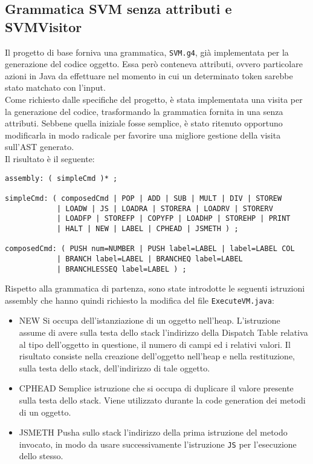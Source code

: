 \documentclass[a4paper]{article}   %
\begin{document}
\subsection{Grammatica SVM senza attributi e SVMVisitor}
Il progetto di base forniva una grammatica, \lstinline|SVM.g4|, già implementata per la generazione del codice oggetto. Essa però conteneva attributi, ovvero particolare azioni in Java da effettuare nel momento in cui un determinato token sarebbe stato matchato con l'input.\\
Come richiesto dalle specifiche del progetto, è stata implementata una visita per la generazione del codice, trasformando la grammatica fornita in una senza attributi. Sebbene quella iniziale fosse semplice, è stato ritenuto opportuno modificarla in modo radicale per favorire una migliore gestione della visita sull'AST generato.\\
Il risultato è il seguente:
\begin{lstlisting}[language=ANTLR,basicstyle=\footnotesize\ttfamily]
assembly: ( simpleCmd )* ;

simpleCmd: ( composedCmd | POP | ADD | SUB | MULT | DIV | STOREW
			| LOADW | JS | LOADRA | STORERA | LOADRV | STORERV
			| LOADFP | STOREFP | COPYFP | LOADHP | STOREHP | PRINT
			| HALT | NEW | LABEL | CPHEAD | JSMETH ) ;

composedCmd: ( PUSH num=NUMBER | PUSH label=LABEL | label=LABEL COL
            | BRANCH label=LABEL | BRANCHEQ label=LABEL
            | BRANCHLESSEQ label=LABEL ) ;
\end{lstlisting}
Rispetto alla grammatica di partenza, sono state introdotte le seguenti istruzioni assembly che hanno quindi richiesto la modifica del file \lstinline|ExecuteVM.java|:
\begin{itemize}
\item NEW\newline
Si occupa dell'istanziazione di un oggetto nell'heap. L'istruzione assume di avere sulla testa dello stack l'indirizzo della Dispatch Table relativa al tipo dell'oggetto in questione, il numero di campi ed i relativi valori. Il risultato consiste nella creazione dell'oggetto nell'heap e nella restituzione, sulla testa dello stack, dell'indirizzo di tale oggetto.
\item CPHEAD\newline
Semplice istruzione che si occupa di duplicare il valore presente sulla testa dello stack. Viene utilizzato durante la code generation dei metodi di un oggetto.
\item JSMETH\newline
Pusha sullo stack l'indirizzo della prima istruzione del metodo invocato, in modo da usare successivamente l'istruzione \lstinline|JS| per l'esecuzione dello stesso.\\\\
\end{itemize}
\end{document}
